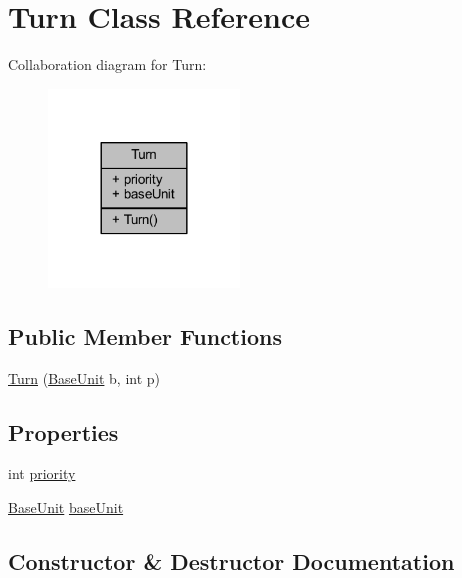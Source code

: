 \hypertarget{class_turn}{}\section{Turn Class Reference}
\label{class_turn}


Collaboration diagram for Turn\+:\nopagebreak
\begin{figure}[H]
\begin{center}
\leavevmode
\includegraphics[width=144pt]{class_turn__coll__graph}
\end{center}
\end{figure}
\subsection*{Public Member Functions}
\begin{DoxyCompactItemize}
\item 
\mbox{\hyperlink{class_turn_a6446f2b617305c390dce97e1c7242066}{Turn}} (\mbox{\hyperlink{class_base_unit}{Base\+Unit}} b, int p)
\end{DoxyCompactItemize}
\subsection*{Properties}
\begin{DoxyCompactItemize}
\item 
int \mbox{\hyperlink{class_turn_aad40e669aa7299a23aa01c1756edd975}{priority}}
\item 
\mbox{\hyperlink{class_base_unit}{Base\+Unit}} \mbox{\hyperlink{class_turn_a59d549b1393677617e4237dcab3e27f9}{base\+Unit}}
\end{DoxyCompactItemize}


\subsection{Constructor \& Destructor Documentation}
\mbox{\label{class_turn_a6446f2b617305c390dce97e1c7242066}} 
